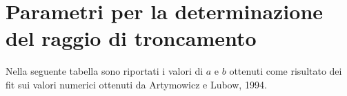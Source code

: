 \appendix
\titleformat{\chapter}[display]
  {\normalfont\huge\bfseries}{\chaptertitlename\ \thechapter}{10pt}{\large}
\titlespacing{\chapter}{0pt}{-15pt}{10pt}
\chapter{Parametri per la determinazione del raggio di troncamento} \label{appendiceA}
Nella seguente tabella sono riportati i valori di $a$ e $b$ ottenuti come risultato dei fit sui valori numerici ottenuti da Artymowicz e Lubow, 1994.
